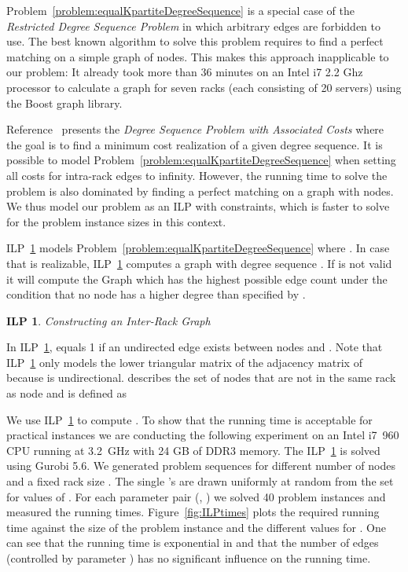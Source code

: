 \documentclass[journal,10pt]{IEEEtran}
\newtheorem{ilp}{ILP}
\begin{document}
		


		Problem~\ref{problem:equalKpartiteDegreeSequence} is a special case of the 
		\emph{Restricted Degree Sequence Problem} \cite{Erdoes:arXiv1301.7523} in which arbitrary edges are forbidden to use.
		The best known algorithm to solve this problem requires to find a perfect matching on a simple graph of  nodes.
		This makes this approach inapplicable to our problem: It already took more than 36 minutes on an Intel i7 2.2 Ghz processor to 
		calculate a graph for seven racks (each consisting of 20 servers) using the Boost graph library.
		
		Reference~\cite{milena02} presents the \emph{Degree Sequence Problem with Associated Costs} where the goal is to find
		a minimum cost realization of a given degree sequence. 
		It is possible to model Problem~\ref{problem:equalKpartiteDegreeSequence} when setting all costs for intra-rack edges to infinity.
		However, the running time to solve the problem is also dominated by finding a perfect matching on a graph with 
		 nodes. We thus model our problem as an ILP with  constraints, which is faster to solve for the problem instance sizes
		in this context.
		
		ILP~\ref{ilp:inter-rack} models Problem~\ref{problem:equalKpartiteDegreeSequence} where .
		In case that  is realizable, ILP~\ref{ilp:inter-rack} computes a graph  with degree sequence . 
		If  is not valid it will compute the Graph  which has the highest possible edge count
		under the condition that no node has a higher degree than specified by .
		
		\begin{ilp}{Constructing an Inter-Rack Graph}
			
			\label{ilp:inter-rack}
		\end{ilp}
		
		In ILP~\ref{ilp:inter-rack},  equals 1 if an undirected edge exists between nodes  and .
		Note that ILP~\ref{ilp:inter-rack} only models the lower triangular matrix of the adjacency matrix of  because  is undirectional.
		 describes the set of nodes that are not in the same rack as node  and is defined as
		
		
		We use ILP~\ref{ilp:inter-rack} to compute .
		To show that the running time is acceptable for practical instances
		we are conducting the following experiment on an Intel i7~960 CPU running at 3.2~GHz with 24 GB of DDR3 memory.
		The ILP~\ref{ilp:inter-rack} is solved using Gurobi 5.6.
		We generated problem sequences  for different number of nodes  and a fixed rack size . 
		The single 's are
		drawn uniformly at random from the set  for values of .
		For each parameter pair (, ) we solved 40 problem instances and measured the running times. 
		Figure~\ref{fig:ILPtimes} plots the required running time against the
		size of the problem instance  and the different values for . One can see that the running time is exponential in  and that
		the number of edges (controlled by parameter ) has no significant influence on the running time.
\end{document}
